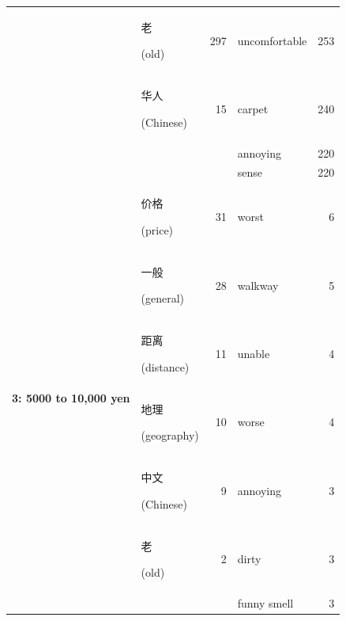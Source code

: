 \documentclass[smallextended,natbib]{svjour3}       %
\begin{document}
\begin{table}[ht]
{\begin{tabular}{|c|lr|lr|}
                                                             & \begin{CJK}{UTF8}{gbsn}老\end{CJK} (old)        & 297  & uncomfortable  & 253 \\  
                                                             & \begin{CJK}{UTF8}{gbsn}华人\end{CJK} (Chinese)   & 15   & carpet         & 240 \\  
                                                             &                                                &      & annoying       & 220 \\  
                                                             &                                                &      & sense          & 220 \\ \hline
        \multirow{10}{*}{\textbf{3: 5000 to 10,000 yen}}     & \begin{CJK}{UTF8}{gbsn}价格\end{CJK} (price)     & 31   & worst          & 6   \\  
                                                             & \begin{CJK}{UTF8}{gbsn}一般\end{CJK} (general)   & 28   & walkway        & 5   \\  
                                                             & \begin{CJK}{UTF8}{gbsn}距离\end{CJK} (distance)  & 11   & unable         & 4   \\  
                                                             & \begin{CJK}{UTF8}{gbsn}地理\end{CJK} (geography) & 10   & worse          & 4   \\  
                                                             & \begin{CJK}{UTF8}{gbsn}中文\end{CJK} (Chinese)   & 9    & annoying       & 3   \\  
                                                             & \begin{CJK}{UTF8}{gbsn}老\end{CJK} (old)        & 2    & dirty          & 3   \\  
                                                             &                                                &      & funny smell    & 3   \\  

\end{tabular}}
\end{table}
\end{document}
